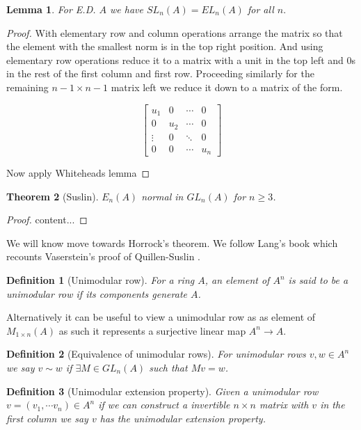 \documentclass[12pt]{article}
\numberwithin{equation}{section}
\newtheorem{theorem}{Theorem}[section]
\newtheorem{definition}{Definition}[section]
\newtheorem{lemma}[theorem]{Lemma}
\begin{document}
	
	\begin{lemma}
		For E.D. $A$ we have $SL_n(A)=EL_n(A)$ for all $n.$
	\end{lemma}
	\begin{proof}
		With elementary row and column operations arrange the matrix so that the element with the smallest norm is in the top right position. And using elementary row operations reduce it to a matrix with a unit in the top left and 0s in the rest of the first column and first row. Proceeding similarly for the remaining $n-1 \times n-1 $ matrix left we reduce it down to a matrix of the form.
		
		\[ \begin{bmatrix}
			u_1 & 0 & \cdots & 0 \\
			0 & u_2 & \cdots & 0 \\
			\vdots & 0 & \ddots & 0\\
			0 & 0 & \cdots & u_n 
		\end{bmatrix} \]
		
	Now apply Whiteheads lemma 
	\end{proof}
	
	\begin{theorem}[Suslin]
		$E_n(A)$ normal in $GL_n(A)$ for $n \geq 3$. 
	\end{theorem}
	\begin{proof}
		content...
	\end{proof}
	
	We will know move towards Horrock's theorem. We follow Lang's book which recounts Vaserstein's proof of Quillen-Suslin \cite{lang02}.
	
	\begin{definition}[Unimodular row]
		For a ring $A$, an element of $A^n$ is said to be a unimodular row if its components generate	$A$. 
	\end{definition}
	
	Alternatively it can be useful to view a unimodular row as as element of $M_{1 \times n} (A) $ as such it represents a surjective linear map $A^n \to A$. 
	
	\begin{definition}[Equivalence of unimodular rows]
		For unimodular rows $v,w\in A^n$ we say $v \sim w $ if $\exists M \in GL_n(A)$ such that $Mv=w$.
	\end{definition}
	
	\begin{definition}[Unimodular extension property]
		Given a unimodular row $v=(v_1,\cdots v_n) \in A^n$ if we can construct a invertible $n \times n $  matrix with $v$ in the first column we say $v$ has the unimodular extension property.
	\end{definition}
	
\end{document}
